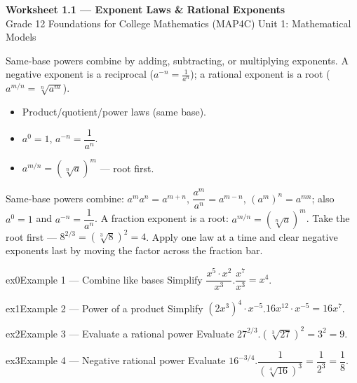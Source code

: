\documentclass[11pt]{article}
\begin{document}
\begin{center}
{\LARGE\bfseries\color{titleblue}Worksheet 1.1 --- Exponent Laws \& Rational Exponents}\\[2pt]
{\small Grade 12 Foundations for College Mathematics (MAP4C) \textperiodcentered{} Unit 1: Mathematical Models}
\end{center}

\begin{ideabox}
Same-base powers combine by adding, subtracting, or multiplying exponents. A negative exponent is a reciprocal ($a^{-n}=\tfrac{1}{a^n}$); a rational exponent is a root ($a^{m/n}=\sqrt[n]{a^m}$).
\begin{itemize}[leftmargin=*,itemsep=2pt]
  \item Product/quotient/power laws (same base).
  \item $a^0=1$, $a^{-n}=\dfrac{1}{a^n}$.
  \item $a^{m/n}=\left(\sqrt[n]{a}\right)^m$ — root first.
\end{itemize}
\end{ideabox}

\begin{learnbox}
Same-base powers combine: $a^m a^n=a^{m+n}$, $\dfrac{a^m}{a^n}=a^{m-n}$, $(a^m)^n=a^{mn}$; also $a^0=1$ and $a^{-n}=\dfrac{1}{a^n}$.
A fraction exponent is a root: $a^{m/n}=\left(\sqrt[n]{a}\right)^m$. Take the root first — $8^{2/3}=(\sqrt[3]{8})^2=4$.
Apply one law at a time and clear negative exponents last by moving the factor across the fraction bar.
\end{learnbox}


\begin{example}{ex0}{Example 1 --- Combine like bases}
Simplify $\dfrac{x^5\cdot x^2}{x^3}$.\soln $\dfrac{x^7}{x^3}=x^4$.
\end{example}

\begin{example}{ex1}{Example 2 --- Power of a product}
Simplify $(2x^3)^4\cdot x^{-5}$.\soln $16x^{12}\cdot x^{-5}=16x^7$.
\end{example}

\begin{example}{ex2}{Example 3 --- Evaluate a rational power}
Evaluate $27^{2/3}$.\soln $(\sqrt[3]{27})^2=3^2=9$.
\end{example}

\begin{example}{ex3}{Example 4 --- Negative rational power}
Evaluate $16^{-3/4}$.\soln $\dfrac{1}{(\sqrt[4]{16})^3}=\dfrac{1}{2^3}=\dfrac18$.
\end{example}
\end{document}
